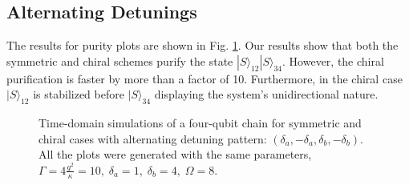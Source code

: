 \subsection{Alternating Detunings}
%
The results for purity plots are shown in Fig. \ref{fig:alternating}. Our results show that both the symmetric and chiral schemes purify the state $|S\rangle_{12} | S \rangle_{34}$. However, the chiral purification is faster by more than a factor of 10. Furthermore, in the chiral case $|S\rangle_{12}$ is stabilized before $|S\rangle_{34}$ displaying the system's unidirectional nature.
%
\begin{figure}[t!]
\centering
{}
\vspace{-.5cm}
    \caption{Time-domain simulations of a four-qubit chain for symmetric and chiral cases with alternating detuning pattern: $(\delta_a , - \delta_a , \delta_b , - \delta_b )$. All the plots were generated with the same parameters, $\Gamma= 4\frac{g^2}{\kappa}=10, \; \delta_a = 1, \; \delta_b = 4, \; \Omega=8$.}
    \label{fig:alternating}
\end{figure}
%
%
